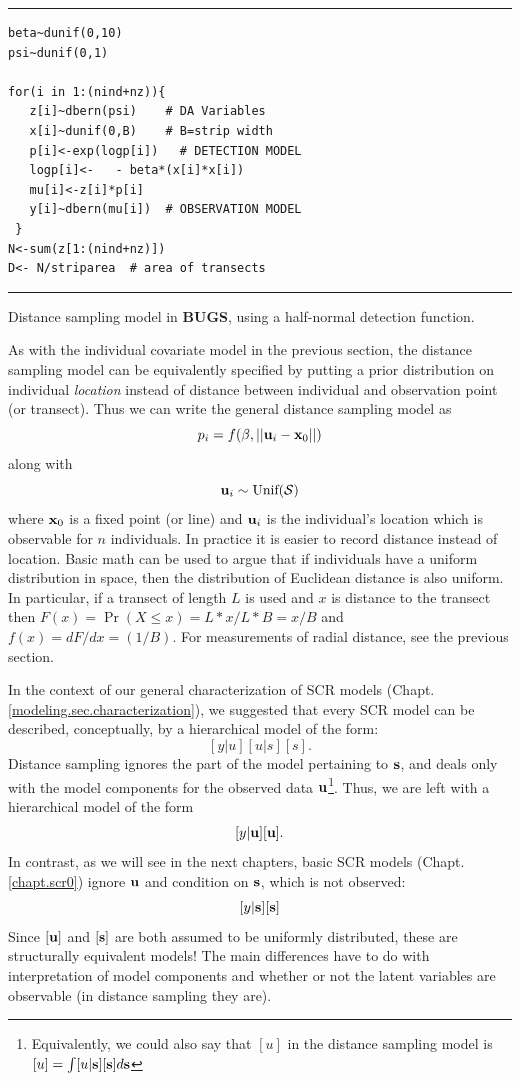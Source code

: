 \begin{panel}[htp]
\centering
\rule[0.15in]{\textwidth}{.03in}
\begin{minipage}{5in}
\begin{verbatim}
beta~dunif(0,10)
psi~dunif(0,1)

for(i in 1:(nind+nz)){
   z[i]~dbern(psi)    # DA Variables
   x[i]~dunif(0,B)    # B=strip width
   p[i]<-exp(logp[i])   # DETECTION MODEL
   logp[i]<-   - beta*(x[i]*x[i])
   mu[i]<-z[i]*p[i]
   y[i]~dbern(mu[i])  # OBSERVATION MODEL
 }
N<-sum(z[1:(nind+nz)])
D<- N/striparea  # area of transects
\end{verbatim}
\end{minipage}
\rule[-0.15in]{\textwidth}{.03in}
\caption{Distance sampling model in {\bf BUGS}, using a half-normal
detection function.}
\label{closed.panel.distance}
\end{panel}

As with the individual covariate model in the previous section, the
distance sampling model can be equivalently specified by putting a
prior distribution on individual {\it location} instead of distance
between individual and observation point (or transect).  Thus we can
write the general distance sampling model as
\[
p_{i} = f(\beta,||{\bf u}_{i} - {\bf x}_0||)
\]
along with
\[
 {\bf u}_{i} \sim \mbox{Unif}({\cal S})
\]
where ${\bf x}_{0}$ is a fixed point (or line) and ${\bf u}_{i}$ is
the individual's location which is observable for $n$ individuals. In
practice it is easier to record distance instead of location.  Basic
math can be used to argue that if individuals have a uniform
distribution in space, then the distribution of Euclidean distance is
also uniform. In particular, if a transect of length $L$ is used and $x$
is distance to the transect then $F(x) = \Pr(X\le x) = L*x/L*B = x/B$ and
$f(x) = dF/dx = (1/B)$. For measurements of radial distance, see the
previous section.

In the context of our general characterization of SCR models 
(Chapt. \ref{modeling.sec.characterization}),
we suggested that every SCR model can be described,
conceptually, by a hierarchical model of the form:
\[
 [y|u][u|s][s].
\]
Distance sampling ignores the part of the model pertaining to ${\bf
  s}$, and deals only with the model components for the observed
data  ${\bf u}$\footnote{Equivalently, we could also say that $[u]$ in
  the distance sampling model is $[u] = \int [u|{\bf s}][{\bf s}]
  d{\bf s}$}. Thus, we are left with a hierarchical model of the form
\[
[y|{\bf u}][{\bf u}].
\]
In contrast, as we will see in the next chapters, basic SCR models
(Chapt. \ref{chapt.scr0}) ignore ${\bf u}$ and condition on ${\bf s}$,
which is not observed:
\[
[y|{\bf s}][{\bf s}]
\]
Since $[{\bf u}]$ and $[{\bf s}]$ are both assumed to be uniformly
distributed, these are structurally equivalent models! The main
differences have to do with interpretation of model components and
whether or not the latent variables are observable (in distance
sampling they are).

